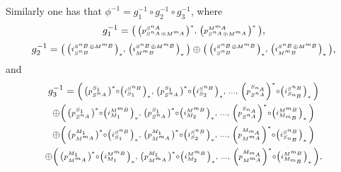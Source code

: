 \begin{remark}
    Similarly one has that \( \phi^{-1} = g_1^{-1} \circ g_2^{-1} \circ g_3^{-1} \), where
    \[
        g_1^{-1} =
        \begin{psmallmatrix}
            \left(  p_{S^{n_A} \oplus M^{m_A}}^{S^{n_A}}  \right)^*, & \left(  p_{S^{n_A} \oplus M^{m_A}}^{M^{m_A}}  \right)^*
        \end{psmallmatrix},
    \]
    \[
        g_2^{-1} =
        \begin{psmallmatrix}
            \left(  i_{S^{n_B}}^{S^{n_B} \oplus M^{m_B}}  \right)_*, & \left(  i_{M^{m_B}}^{S^{n_B} \oplus M^{m_B}}  \right)_*
        \end{psmallmatrix}
        \oplus
        \begin{psmallmatrix}
            \left(  i_{S^{n_B}}^{S^{n_B} \oplus M^{m_B}}  \right)_*, & \left(  i_{M^{m_B}}^{S^{n_B} \oplus M^{m_B}}  \right)_*
        \end{psmallmatrix},
    \]
    and
    \begin{multline*}
        g_3^{-1} =
        \begin{psmallmatrix}
            \left(  p_{S^{n_A}}^{S_1}  \right)^* \circ \left(  i_{S_1}^{S^{n_B}}  \right)_*, & \left(  p_{S^{n_A}}^{S_1}  \right)^* \circ \left(  i_{S_2}^{S^{n_B}}  \right)_*, & \dots, & \left(  p_{S^{n_A}}^{S_{n_A}}  \right)^* \circ \left(  i_{S_{n_B}}^{S^{n_B}}  \right)_*
        \end{psmallmatrix} \\
        \oplus
        \begin{psmallmatrix}
            \left(  p_{S^{n_A}}^{S_1}  \right)^* \circ \left(  i_{M_1}^{M^{m_B}}  \right)_*, & \left(  p_{S^{n_A}}^{S_1}  \right)^* \circ \left(  i_{M_2}^{M^{m_B}}  \right)_*, & \dots, & \left(  p_{S^{n_A}}^{S_{n_A}}  \right)^* \circ \left(  i_{M_{m_B}}^{M^{m_B}}  \right)_*
        \end{psmallmatrix} \\
        \oplus
        \begin{psmallmatrix}
            \left(  p_{M^{m_A}}^{M_1}  \right)^* \circ \left(  i_{S_1}^{S^{n_B}}  \right)_*, & \left(  p_{M^{m_A}}^{M_1}  \right)^* \circ \left(  i_{S_2}^{S^{n_B}}  \right)_*, & \dots, & \left(  p_{M^{m_A}}^{M_{m_A}}  \right)^* \circ \left(  i_{S_{n_B}}^{S^{n_B}}  \right)_*
        \end{psmallmatrix} \\
        \oplus
        \begin{psmallmatrix}
            \left(  p_{M^{m_A}}^{M_1}  \right)^* \circ \left(  i_{M_1}^{M^{m_B}}  \right)_*, & \left(  p_{M^{m_A}}^{M_1}  \right)^* \circ \left(  i_{M_2}^{M^{m_B}}  \right)_*, & \dots, & \left(  p_{M^{m_A}}^{M_{m_A}}  \right)^* \circ \left(  i_{M_{m_B}}^{M^{m_B}}  \right)_*
        \end{psmallmatrix}.
    \end{multline*}


\end{remark}
